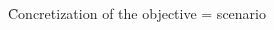 \begin{frame}
\begin{columns}
\begin{column}{0.45\textwidth}
\end{column}
\end{columns}

\medskip
\begin{center}
\f Concretization of the objective = scenario

\end{center}
\end{frame}



